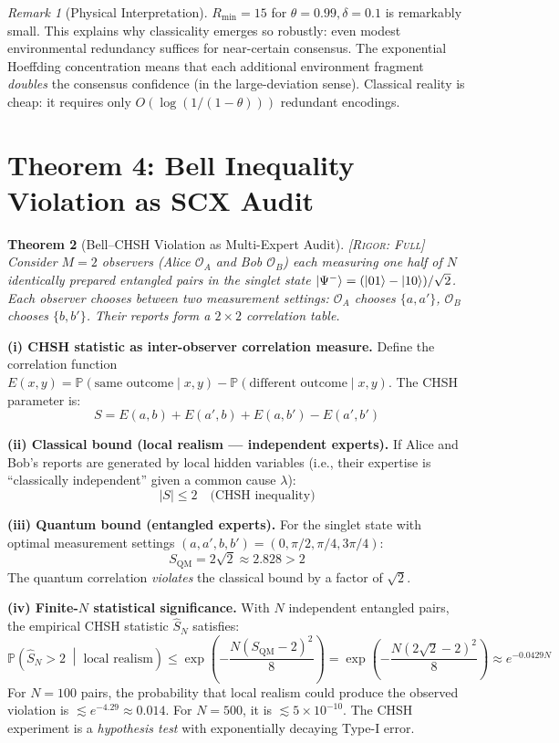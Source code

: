 \documentclass[11pt,a4paper]{article}
\newtheorem{theorem}{Theorem}[section]
\theoremstyle{definition}
\theoremstyle{remark}
\newtheorem{remark}[theorem]{Remark}
\newcommand{\Pbb}{\mathbb{P}}
\newcommand{\Obs}{\mathcal{O}}
\newcommand{\rigorFull}{\textsc{[Rigor: Full]}}
\begin{document}
\begin{remark}[Physical Interpretation]
$R_{\min} = 15$ for $\theta = 0.99, \delta = 0.1$ is remarkably small. This explains why classicality emerges so robustly: even modest environmental redundancy suffices for near-certain consensus. The exponential Hoeffding concentration means that each additional environment fragment \emph{doubles} the consensus confidence (in the large-deviation sense). Classical reality is cheap: it requires only $O(\log(1/(1-\theta)))$ redundant encodings.
\end{remark}

\section{Theorem 4: Bell Inequality Violation as SCX Audit}

\begin{theorem}[Bell--CHSH Violation as Multi-Expert Audit]
\label{thm:bell-audit}
\rigorFull
Consider $M=2$ observers (Alice $\Obs_A$ and Bob $\Obs_B$) each measuring one half of $N$ identically prepared entangled pairs in the singlet state $\ket{\Psi^-} = (\ket{01} - \ket{10})/\sqrt{2}$. Each observer chooses between two measurement settings: $\Obs_A$ chooses $\{a, a'\}$, $\Obs_B$ chooses $\{b, b'\}$. Their reports form a $2 \times 2$ correlation table.
\end{theorem}

\medskip
\noindent\textbf{(i) CHSH statistic as inter-observer correlation measure.}
Define the correlation function $E(x, y) = \Pbb(\text{same outcome} \mid x, y) - \Pbb(\text{different outcome} \mid x, y)$. The CHSH parameter is:
\[
S = E(a, b) + E(a', b) + E(a, b') - E(a', b')
\]

\noindent\textbf{(ii) Classical bound (local realism --- independent experts).}
If Alice and Bob's reports are generated by local hidden variables (i.e., their expertise is ``classically independent'' given a common cause $\lambda$):
\[
|S| \leq 2 \quad \text{(CHSH inequality)}
\]

\noindent\textbf{(iii) Quantum bound (entangled experts).}
For the singlet state with optimal measurement settings $(a, a', b, b') = (0, \pi/2, \pi/4, 3\pi/4)$:
\[
S_{\text{QM}} = 2\sqrt{2} \approx 2.828 > 2
\]
The quantum correlation \emph{violates} the classical bound by a factor of $\sqrt{2}$.

\noindent\textbf{(iv) Finite-$N$ statistical significance.}
With $N$ independent entangled pairs, the empirical CHSH statistic $\hat{S}_N$ satisfies:
\[
\Pbb\!\left(\hat{S}_N > 2 \;\middle|\; \text{local realism}\right) \leq \exp\!\left(-\frac{N(S_{\text{QM}} - 2)^2}{8}\right) = \exp\!\left(-\frac{N(2\sqrt{2} - 2)^2}{8}\right) \approx e^{-0.0429 N}
\]
For $N = 100$ pairs, the probability that local realism could produce the observed violation is $\lesssim e^{-4.29} \approx 0.014$. For $N = 500$, it is $\lesssim 5 \times 10^{-10}$. The CHSH experiment is a \emph{hypothesis test} with exponentially decaying Type-I error.
\end{document}
